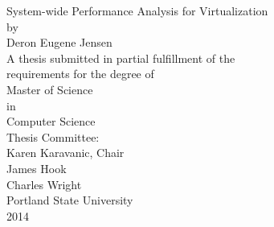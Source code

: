 \begin{titlepage}
\begin{centering}
\vspace*{1in}
System-wide Performance Analysis for Virtualization \\
\vspace{7\baselineskip}\vspace{-\parskip}
by \\
\vspace{1\baselineskip}\vspace{-\parskip}
Deron Eugene Jensen \\
\vspace{7\baselineskip}\vspace{-\parskip}
A thesis submitted in partial fulfillment of the \\
requirements for the degree of \\
\vspace{3\baselineskip}\vspace{-\parskip}
Master of Science \\
in \\
Computer Science \\
\vspace{3\baselineskip}\vspace{-\parskip}
Thesis Committee: \\
Karen Karavanic, Chair \\
James Hook \\
Charles Wright \\
\vspace{3\baselineskip}\vspace{-\parskip}
Portland State University \\
2014\\
\end{centering}
\end{titlepage}
